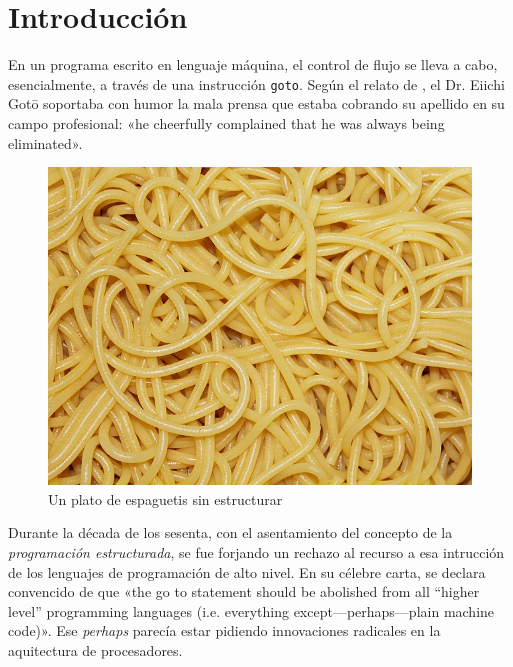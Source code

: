 \documentclass{tfg_domingo}
\begin{document}

\portada
\frontmatter
\gracias{}
\resumen{}{}
\tableofcontents

\mainmatter
\chapter{Introducción}

En un programa escrito en lenguaje máquina, el control de
flujo se lleva a cabo, esencialmente, a través de una
instrucción {\tt goto}. Según el relato de
\citet[p. 264]{1974_Knuth}, el Dr. Eiichi Gotō
%
%
soportaba con humor la mala
prensa que estaba cobrando su apellido en su campo
profesional: «he cheerfully complained that he was always
being eliminated».

\begin{figure}[ht!] %
\begin{center}
\includegraphics[width=.7\linewidth]{espaguetis}
\end{center}
\caption{Un plato de espaguetis sin estructurar}
\label{fig_pro}
\end{figure}


Durante la década de los sesenta, con el asentamiento del
concepto de la \emph{programación estructurada}, se fue
forjando un rechazo al recurso a esa intrucción de los
lenguajes de programación de alto nivel. En su célebre
carta, \citet{1968_Dijkstra} se declara convencido de que
«the go to statement should be abolished from all
  “higher level” programming languages (i.e. everything
  except—perhaps—plain machine code)». Ese \emph{perhaps}
parecía estar pidiendo innovaciones radicales en la
aquitectura de procesadores.
\end{document}
